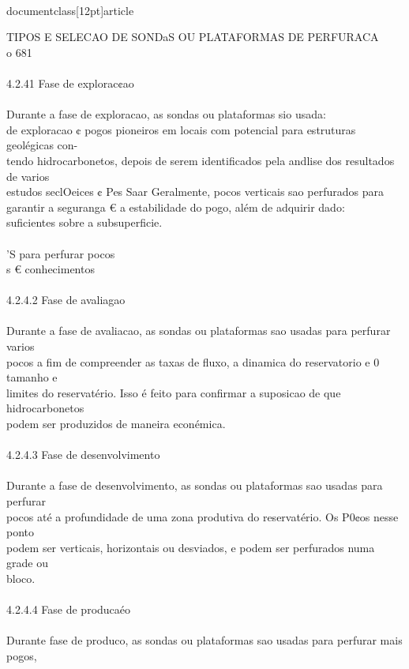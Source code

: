 \\documentclass[12pt]{article}
\begin{document}
TIPOS E SELECAO DE SONDaS OU PLATAFORMAS DE PERFURACA\\
o 681\\
\\
4.2.41 Fase de explorac¢ao\\
\\
Durante a fase de exploracao, as sondas ou plataformas sio usada:\\
de exploracao ¢ pogos pioneiros em locais com potencial para estruturas geolégicas con-\\
tendo hidrocarbonetos, depois de serem identificados pela andlise dos resultados de varios\\
estudos seclOeices ¢ Pes Saar Geralmente, pocos verticais sao perfurados para\\
garantir a seguranga € a estabilidade do pogo, além de adquirir dado:\\
suficientes sobre a subsuperficie.\\
\\
'S para perfurar pocos\\
s € conhecimentos\\
\\
4.2.4.2 Fase de avaliagao\\
\\
Durante a fase de avaliacao, as sondas ou plataformas sao usadas para perfurar varios\\
pocos a fim de compreender as taxas de fluxo, a dinamica do reservatorio e 0 tamanho e\\
limites do reservatério. Isso é feito para confirmar a suposicao de que hidrocarbonetos\\
podem ser produzidos de maneira econémica.\\
\\
4.2.4.3 Fase de desenvolvimento\\
\\
Durante a fase de desenvolvimento, as sondas ou plataformas sao usadas para perfurar\\
pocos até a profundidade de uma zona produtiva do reservatério. Os P0¢os nesse ponto\\
podem ser verticais, horizontais ou desviados, e podem ser perfurados numa grade ou\\
bloco.\\
\\
4.2.4.4 Fase de producaéo\\
\\
Durante fase de produco, as sondas ou plataformas sao usadas para perfurar mais pogos,\\
\end{document}
